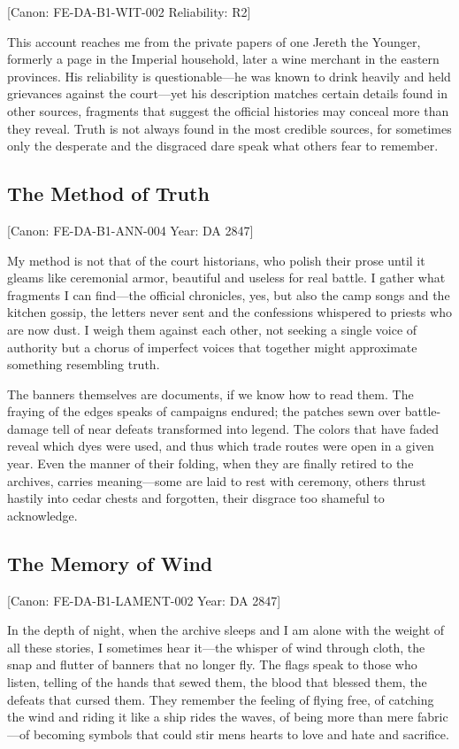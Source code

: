 {[}Canon: FE-DA-B1-WIT-002 \textbar{} Reliability: R2{]}

This account reaches me from the private papers of one Jereth the
Younger, formerly a page in the Imperial household, later a wine
merchant in the eastern provinces. His reliability is questionable---he
was known to drink heavily and held grievances against the court---yet
his description matches certain details found in other sources,
fragments that suggest the official histories may conceal more than they
reveal. Truth is not always found in the most credible sources, for
sometimes only the desperate and the disgraced dare speak what others
fear to remember.

\subsection{The Method of Truth}\label{the-method-of-truth}

{[}Canon: FE-DA-B1-ANN-004 \textbar{} Year: DA 2847{]}

My method is not that of the court historians, who polish their prose
until it gleams like ceremonial armor, beautiful and useless for real
battle. I gather what fragments I can find---the official chronicles,
yes, but also the camp songs and the kitchen gossip, the letters never
sent and the confessions whispered to priests who are now dust. I weigh
them against each other, not seeking a single voice of authority but a
chorus of imperfect voices that together might approximate something
resembling truth.

The banners themselves are documents, if we know how to read them. The
fraying of the edges speaks of campaigns endured; the patches sewn over
battle-damage tell of near defeats transformed into legend. The colors
that have faded reveal which dyes were used, and thus which trade routes
were open in a given year. Even the manner of their folding, when they
are finally retired to the archives, carries meaning---some are laid to
rest with ceremony, others thrust hastily into cedar chests and
forgotten, their disgrace too shameful to acknowledge.

\subsection{The Memory of Wind}\label{the-memory-of-wind}

{[}Canon: FE-DA-B1-LAMENT-002 \textbar{} Year: DA 2847{]}

In the depth of night, when the archive sleeps and I am alone with the
weight of all these stories, I sometimes hear it---the whisper of wind
through cloth, the snap and flutter of banners that no longer fly. The
flags speak to those who listen, telling of the hands that sewed them,
the blood that blessed them, the defeats that cursed them. They remember
the feeling of flying free, of catching the wind and riding it like a
ship rides the waves, of being more than mere fabric---of becoming
symbols that could stir men\textquotesingle s hearts to love and hate
and sacrifice.

